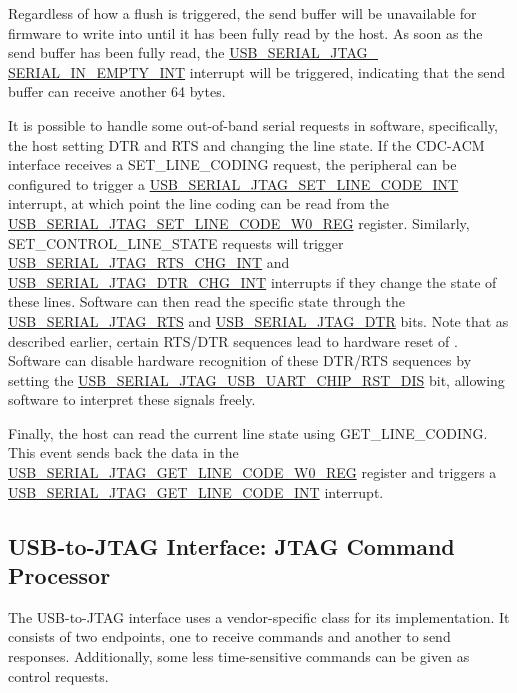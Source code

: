 \documentclass[main\_\_EN.tex]{subfiles}
\begin{document}
Regardless of how a flush is triggered, the send buffer will be unavailable for firmware to write into until it has been fully read by the host. As soon as the send buffer has been fully read, the \hyperref[fielddesc:USBSERIALJTAGSERIALINEMPTYINTRAW]{USB\_SERIAL\_JTAG\_\\SERIAL\_IN\_EMPTY\_INT} interrupt will be triggered, indicating that the send buffer can receive another 64 bytes.

It is possible to handle some out-of-band serial requests in software, specifically, the host setting DTR and RTS and changing the line state. If the CDC-ACM interface receives a SET\_LINE\_CODING request, the peripheral can be configured to trigger a \hyperref[int:USBSERIALJTAGSETLINECODEINT]{USB\_SERIAL\_JTAG\_SET\_LINE\_CODE\_INT} interrupt, at which point the line coding can be read from the \hyperref[regdesc:USBSERIALJTAGSETLINECODEW0REG]{USB\_SERIAL\_JTAG\_SET\_LINE\_CODE\_W0\_REG} register. Similarly, SET\_CONTROL\_LINE\_STATE requests will trigger \hyperref[int:USBSERIALJTAGRTSCHGINT]{USB\_SERIAL\_JTAG\_RTS\_CHG\_INT} and \hyperref[int:USBSERIALJTAGDTRCHGINT]{USB\_SERIAL\_JTAG\_DTR\_CHG\_INT} interrupts if they change the state of these lines. Software can then read the specific state through the \hyperref[fielddesc:USBSERIALJTAGRTS]{USB\_SERIAL\_JTAG\_RTS} and \hyperref[fielddesc:USBSERIALJTAGDTR]{USB\_SERIAL\_JTAG\_DTR} bits. Note that as described earlier, certain RTS/DTR sequences lead to hardware reset of \chipname{}. Software can disable hardware recognition of these DTR/RTS sequences by setting the \hyperref[fielddesc:USBSERIALJTAGUSBUARTCHIPRSTDIS]{USB\_SERIAL\_JTAG\_USB\_UART\_CHIP\_RST\_DIS} bit, allowing software to interpret these signals freely.

Finally, the host can read the current line state using GET\_LINE\_CODING. This event sends back the data in the \hyperref[regdesc:USBSERIALJTAGGETLINECODEW0REG]{USB\_SERIAL\_JTAG\_GET\_LINE\_CODE\_W0\_REG} register and triggers a \hyperref[int:USBSERIALJTAGGETLINECODEINT]{USB\_SERIAL\_JTAG\_GET\_LINE\_CODE\_INT} interrupt.

\subsection{USB-to-JTAG Interface: JTAG Command Processor}

The USB-to-JTAG interface uses a vendor-specific class for its implementation. It consists of two endpoints, one to receive commands and another to send responses. Additionally, some less time-sensitive commands can be given as control requests.
\end{document}
